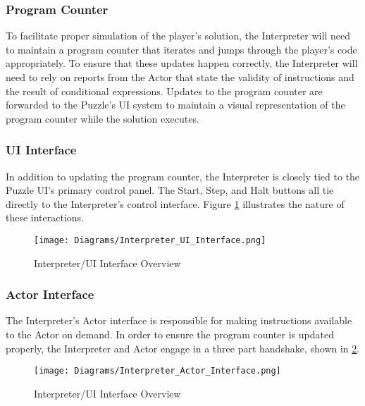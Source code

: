 \subsubsection{Program Counter}
To facilitate proper simulation of the player's solution, the Interpreter will need to maintain 
a program counter that iterates and jumps through the player's code appropriately. To 
ensure that these updates happen correctly, the Interpreter will need to rely on reports 
from the Actor that state the validity of instructions and the result of conditional expressions.
Updates to the program counter are forwarded to the Puzzle's UI system to maintain a 
visual representation of the program counter while the solution executes.

\subsubsection{UI Interface}
In addition to updating the program counter, the Interpreter is closely tied to the Puzzle UI's primary
control panel. The Start, Step, and Halt buttons all tie directly to the Interpreter's control interface.
Figure \ref{fig:interpreter_UI_interface} illustrates the nature of these interactions.

\begin{figure}[!htb]
	\caption{Interpreter/UI Interface Overview}
	\label{fig:interpreter_UI_interface}
	\centering
	\texttt{[image: Diagrams/Interpreter\_UI\_Interface.png]}
\end{figure}

\subsubsection{Actor Interface}
The Interpreter's Actor interface is responsible for making instructions available to the 
Actor on demand. In order to ensure the program counter is updated properly, the 
Interpreter and Actor engage in a three part handshake, shown in 
\ref{fig:interpreter_Actor_interface}.\\

\begin{figure}[!hb]
    \caption{Interpreter/UI Interface Overview}
    \label{fig:interpreter_Actor_interface}
    \centering
    \texttt{[image: Diagrams/Interpreter\_Actor\_Interface.png]}
\end{figure}

